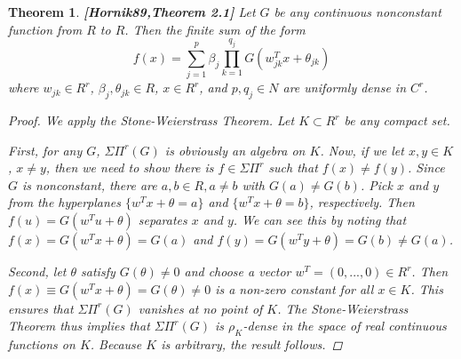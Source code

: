 \documentclass[12pt]{amsart}
\newtheorem{definition}{Definition}
\theoremstyle{plain}
\newtheorem{thm}{Theorem}[section]
\theoremstyle{definition}
\theoremstyle{remark}
\numberwithin{equation}{section}
\numberwithin{thm}{section}
\begin{document}
\begin{thm}\label{HornikThm2.1}
\textbf{[Hornik89,Theorem 2.1]} 
Let $G$ be any continuous nonconstant function from $R$ to $R$. Then the finite sum of the form
\begin{equation}
    f(x)=\sum_{j=1}^{p} \beta_{j} \prod_{k=1}^{q_j} G(w_{jk}^{T}x+\theta_{jk})
\end{equation}
where $w_{jk} \in R^r$, $\beta_{j}, \theta_{jk} \in R$, $x \in R^r$, and $p, q_j \in N$ are uniformly dense in $C^{r}$. 
\begin{proof}
We apply the Stone-Weierstrass Theorem. Let $K \subset R^r$ be any compact set. 

First, for any $G$, $\Sigma\Pi^r(G)$ is obviously an algebra on $K$.
Now, if we let $x,y \in K$, $x \neq y$, then we need to show there is $f \in \Sigma\Pi^r$ such that $f(x) \neq f(y)$. Since $G$ is nonconstant, there are $a,b \in R, a \neq b$ with $G(a) \neq G(b)$. Pick $x$ and $y$ from the hyperplanes $\{ w^Tx+\theta=a\}$ and $\{w^Tx+\theta=b \}$, respectively. Then $f(u)=G(w^Tu+\theta)$ separates $x$ and $y$. We can see this by noting that $f(x)=G(w^Tx+\theta)=G(a)$ and $f(y)=G(w^Ty+\theta)=G(b) \neq G(a)$. 

Second, let $\theta$ satisfy $G(\theta)\neq 0$ and choose a vector $w^T=(0,...,0) \in R^r$. Then $f(x) \equiv G(w^Tx+\theta)=G(\theta)\neq 0$ is a non-zero constant for all $x \in K$. This ensures that $\Sigma\Pi^r(G)$ vanishes at no point of $K$. The Stone-Weierstrass Theorem thus implies that $\Sigma\Pi^r(G)$ is $\rho_K$-dense in the space of real continuous functions on $K$. Because $K$ is arbitrary, the result follows.
\end{proof}
\end{thm}
\end{document}

